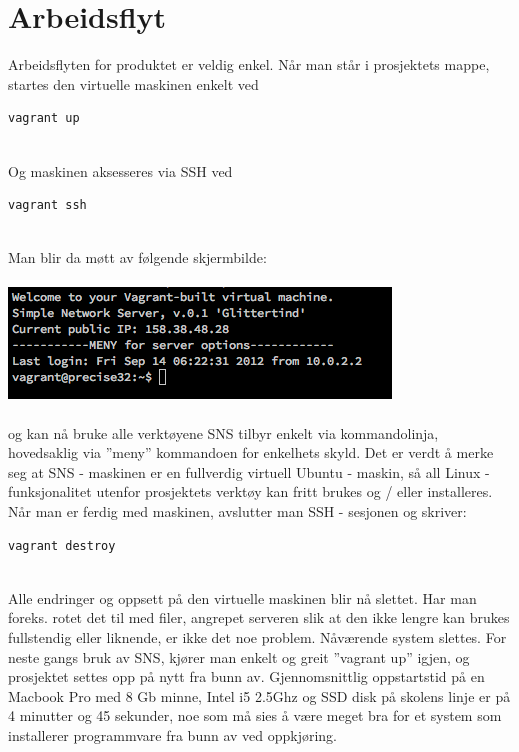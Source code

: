 \documentclass{article}
\begin{document}
\section{Arbeidsflyt}
Arbeidsflyten for produktet er veldig enkel. Når man står i prosjektets mappe, startes den virtuelle maskinen enkelt ved \\
\begin{lstlisting}
vagrant up
\end{lstlisting}
\\ 
Og maskinen aksesseres via SSH ved
\begin{lstlisting}
vagrant ssh
\end{lstlisting}
\\
Man blir da møtt av følgende skjermbilde: \\ \\
\includegraphics[scale = 0.7]{pictures/vagrantSSH.png}
\\ \\
og kan nå bruke alle verktøyene SNS tilbyr enkelt via kommandolinja, hovedsaklig via ''meny'' kommandoen for enkelhets skyld. Det er verdt å merke seg at SNS - maskinen er en fullverdig virtuell Ubuntu - maskin, så all Linux - funksjonalitet utenfor prosjektets verktøy kan fritt brukes og / eller installeres. \\ 
Når man er ferdig med maskinen, avslutter man SSH - sesjonen og skriver: \\
\begin{lstlisting}
vagrant destroy
\end{lstlisting}
\\
Alle endringer og oppsett på den virtuelle maskinen blir nå slettet. Har man foreks. rotet det til med filer, angrepet serveren slik at den ikke lengre kan brukes fullstendig eller liknende, er ikke det noe problem. Nåværende system slettes. For neste gangs bruk av SNS, kjører man enkelt og greit ''vagrant up'' igjen, og prosjektet settes opp på nytt fra bunn av. Gjennomsnittlig oppstartstid på en Macbook Pro med 8 Gb minne, Intel i5 2.5Ghz og SSD disk på skolens linje er på 4 minutter og 45 sekunder, noe som må sies å være meget bra for et system som installerer programmvare fra bunn av ved oppkjøring.
\end{document}

